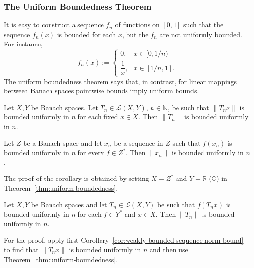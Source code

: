 \subsubsection{The Uniform Boundedness Theorem}\label{subsec:uniform-boundedness-theorem}

It is easy to construct a sequence $f_n$ of functions on $[0,1]$ such that the sequence $f_n(x)$ is bounded for each $x$, but the $f_n$ are not uniformly bounded. For instance,
\begin{equation}\label{eq:pointwise-bounded-not-uniform-function-sequence}
f_n(x):=\begin{cases}0,&x\in[0,1/n)\\\dfrac{1}{x},&x\in[1/n,1].\end{cases}
\end{equation}
The uniform boundedness theorem says that, in contrast, for linear mappings between Banach spaces pointwise bounds imply uniform bounds.

\begin{Theorem}
\label{thm:uniform-boundedness}
Let $X,Y$ be Banach spaces. Let $T_n\in\mathcal{L}(X,Y)$, $n\in\mathbb{N}$, be such that $\|T_nx\|$ is bounded uniformly in $n$ for each fixed $x\in X$. Then $\|T_n\|$ is bounded uniformly in $n$.
\end{Theorem}

\begin{Corollary}
\label{cor:weakly-bounded-sequence-norm-bound}
Let $Z$ be a Banach space and let $x_n$ be a sequence in $Z$ such that $f(x_n)$ is bounded uniformly in $n$ for every $f\in Z^*$. Then $\|x_n\|$ is bounded uniformly in $n$.
\end{Corollary}

The proof of the corollary is obtained by setting $X=Z^*$ and $Y=\mathbb{R}$ ($\mathbb{C}$) in Theorem~\ref{thm:uniform-boundedness}.

\begin{Corollary}
\label{cor:weak-operator-bounds-imply-uniform-bound}
Let $X,Y$ be Banach spaces and let $T_n\in\mathcal{L}(X,Y)$ be such that $f(T_nx)$ is bounded uniformly in $n$ for each $f\in Y^*$ and $x\in X$. Then $\|T_n\|$ is bounded uniformly in $n$.
\end{Corollary}

For the proof, apply first Corollary~\ref{cor:weakly-bounded-sequence-norm-bound} to find that $\|T_nx\|$ is bounded uniformly in $n$ and then use Theorem~\ref{thm:uniform-boundedness}.

